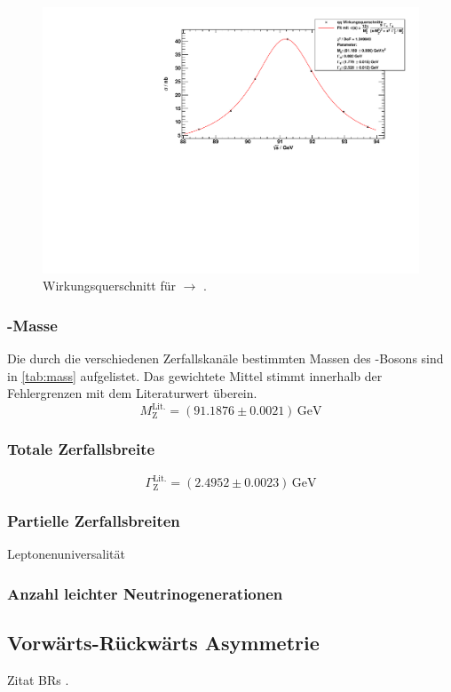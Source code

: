 \begin{figure}[H]
    \begin{center}
        \includegraphics[width=\textwidth]{../img/crosssections_qq.pdf}
        \caption{Wirkungsquerschnitt für \ee $\to$ \qq.}
        \label{img:crosssection:qq}
    \end{center}
\end{figure}

\subsubsection{\Z-Masse}
Die durch die verschiedenen Zerfallskanäle bestimmten Massen des \Z-Bosons sind in \autoref{tab:mass} aufgelistet. Das gewichtete Mittel 
stimmt innerhalb der Fehlergrenzen mit dem Literaturwert \cite{pdg} überein.
\begin{equation}
    M_\text{Z}^\text{Lit.} = (91.1876 \pm 0.0021)\,\text{GeV}
\end{equation}

\subsubsection{Totale Zerfallsbreite}
\begin{equation}
    \Gamma_\text{Z}^\text{Lit.} = (2.4952 \pm 0.0023)\,\text{GeV}
\end{equation}

\subsubsection{Partielle Zerfallsbreiten}
\label{subsub:partWidth}

Leptonenuniversalität
\subsubsection{Anzahl leichter Neutrinogenerationen}
\subsection{Vorwärts-Rückwärts Asymmetrie}

Zitat BRs \cite{pdg}.